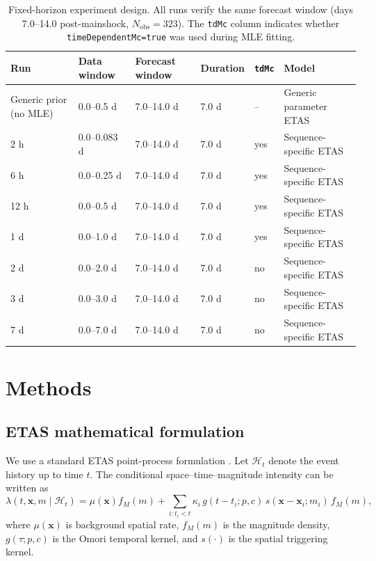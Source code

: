 \documentclass[12pt,letterpaper]{article}
\begin{document}
\begin{table}[ht]
\centering
\small
\caption{Fixed-horizon experiment design. All runs verify the same forecast
window (days 7.0--14.0 post-mainshock, $N_{\mathrm{obs}}=323$). The
\texttt{tdMc} column indicates whether \texttt{timeDependentMc=true} was used
during MLE fitting.}
\label{tab:design}
\begin{tabular}{llllll}
\toprule
Run & Data window & Forecast window & Duration & \texttt{tdMc} & Model \\
\midrule
Generic prior (no MLE) & 0.0--0.5 d & 7.0--14.0 d & 7.0 d & -- & Generic parameter ETAS \\
2 h & 0.0--0.083 d & 7.0--14.0 d & 7.0 d & yes & Sequence-specific ETAS \\
6 h & 0.0--0.25 d & 7.0--14.0 d & 7.0 d & yes & Sequence-specific ETAS \\
12 h & 0.0--0.5 d & 7.0--14.0 d & 7.0 d & yes & Sequence-specific ETAS \\
1 d & 0.0--1.0 d & 7.0--14.0 d & 7.0 d & yes & Sequence-specific ETAS \\
2 d & 0.0--2.0 d & 7.0--14.0 d & 7.0 d & no & Sequence-specific ETAS \\
3 d & 0.0--3.0 d & 7.0--14.0 d & 7.0 d & no & Sequence-specific ETAS \\
7 d & 0.0--7.0 d & 7.0--14.0 d & 7.0 d & no & Sequence-specific ETAS \\
\bottomrule
\end{tabular}
\end{table}

\section{Methods}

\subsection{ETAS mathematical formulation}

We use a standard ETAS point-process formulation \cite{ogata1988}. Let
$\mathcal{H}_t$ denote the event history up to time $t$. The conditional
space--time--magnitude intensity can be written as
\begin{equation}
\lambda(t,\mathbf{x},m \mid \mathcal{H}_t) =
\mu(\mathbf{x}) f_M(m) +
\sum_{i:t_i<t} \kappa_i \, g(t-t_i; p,c)\, s(\mathbf{x}-\mathbf{x}_i; m_i)\, f_M(m),
\label{eq:etas_intensity}
\end{equation}
where $\mu(\mathbf{x})$ is background spatial rate, $f_M(m)$ is the magnitude
density, $g(\tau;p,c)$ is the Omori temporal kernel, and $s(\cdot)$ is the
spatial triggering kernel.
\end{document}
